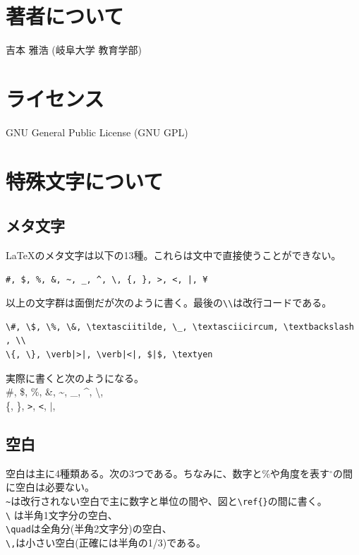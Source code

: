 \documentclass[a4j]{jsarticle}
\begin{document}
\section*{著者について}

吉本 雅浩 (岐阜大学 教育学部)

\section*{ライセンス}

GNU General Public License (GNU GPL)

\newpage %
\section{特殊文字について}
\subsection{メタ文字}
\LaTeX のメタ文字は以下の13種。これらは文中で直接使うことができない。
\begin{verbatim}
#, $, %, &, ~, _, ^, \, {, }, >, <, |, ¥
\end{verbatim}
以上の文字群は面倒だが次のように書く。最後の\verb|\\|は改行コードである。
\begin{verbatim}
\#, \$, \%, \&, \textasciitilde, \_, \textasciicircum, \textbackslash , \\
\{, \}, \verb|>|, \verb|<|, $|$, \textyen
\end{verbatim}
実際に書くと次のようになる。\\
\#, \$, \%, \&, \textasciitilde, \_, \textasciicircum, \textbackslash , \\
\{, \}, \verb|>|, \verb|<|, $|$, \textyen

\subsection{空白}
空白は主に4種類ある。次の3つである。ちなみに、数字と\%や角度を表す$^\circ$の間に空白は必要ない。\\
\verb|~|は改行されない空白で主に数字と単位の間や、図と\verb|\ref{}|の間に書く。\\
\verb|\| は半角1文字分の空白、\\
\verb|\quad|は全角分(半角2文字分)の空白、\\
\verb|\,|は小さい空白(正確には半角の1/3)である。
\end{document}
